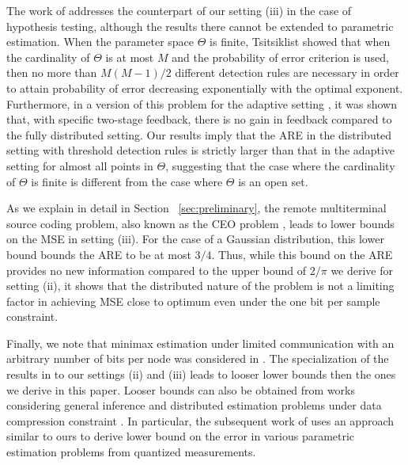 \documentclass[letterpaper, 11pt]{IEEEtran}      %
\begin{document}
The work of \cite{52470} addresses the counterpart of our setting (iii) in the case of hypothesis testing, although the results there cannot be extended to parametric estimation. When the parameter space $\Theta$ is finite, Tsitsiklist \cite{tsitsiklis1988decentralized} showed that when the cardinality of $\Theta$ is at most $M$ and the probability of error criterion is used, then no more than $M(M-1)/2$ different detection rules are necessary in order to attain probability of error decreasing exponentially with the optimal exponent. %
Furthermore, in a version of this problem for the adaptive setting \cite{5751320}, it was shown that, with specific two-stage feedback, there is no gain in feedback compared to the fully distributed setting. Our results imply that the ARE in the distributed setting with threshold detection rules is strictly larger than that in the adaptive setting for almost all points in $\Theta$, suggesting that the case where the cardinality of $\Theta$ is finite is different from the case where $\Theta$ is an open set.\par
%
As we explain in detail in Section~ \ref{sec:preliminary}, the remote multiterminal source coding problem, also known as the CEO problem \cite{berger1996ceo, viswanathan1997quadratic, oohama1998rate, prabhakaran2004rate}, leads to lower bounds on the MSE in setting (iii). For the case of a Gaussian distribution, this lower bound bounds the ARE to be at most $3/4$. Thus, while this bound on the ARE provides no new information compared to the upper bound of $2/\pi$ we derive for setting (ii), it shows that the distributed nature of the problem is not a limiting factor in achieving MSE close to optimum even under the one bit per sample constraint. 
 \par
% 
Finally, we note that minimax estimation under limited communication with an arbitrary number of bits per node was considered in 
\cite{zhang2013information, duchi2014optimality}. The specialization of the results in \cite{zhang2013information, duchi2014optimality} to our settings (ii) and (iii) leads to looser lower bounds then the ones we derive in this paper. Looser bounds can also be obtained from works considering general inference and distributed estimation problems under data compression constraint \cite{DBLP:journals/corr/abs-1802-08417, zhang1988estimation, han2018distributed, xu2017information, Barnes2018}. In particular, the subsequent work of \cite{Barnes2018} uses an approach similar to ours to derive lower bound on the error in various parametric estimation problems from quantized measurements. \\
\end{document}
